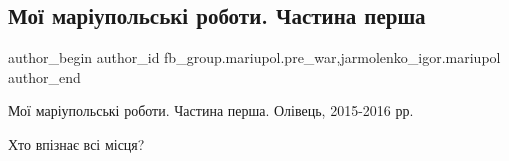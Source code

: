  
 
 
 
 

\subsection{Мої маріупольські роботи. Частина перша}
\label{sec:11_01_2023.fb.fb_group.mariupol.pre_war.4.mo__mar_upolsk__robo}
 
\ifcmt
 author_begin
   author_id fb_group.mariupol.pre_war,jarmolenko_igor.mariupol
 author_end
\fi

Мої маріупольські роботи. Частина перша. Олівець, 2015-2016 рр.

Хто впізнає всі місця?
